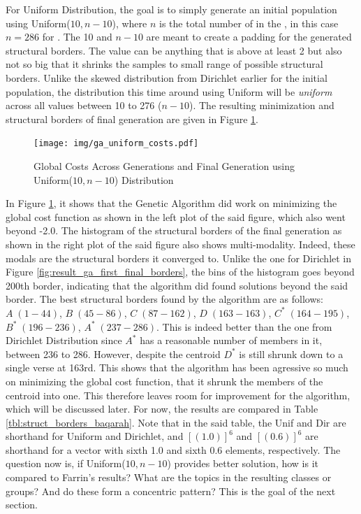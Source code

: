 For Uniform Distribution, the goal is to simply generate an initial population using Uniform($10,n-10$), where $n$ is the total number of   in the  , in this case $n=286$ for  . The 10 and $n-10$ are meant to create a padding for the generated structural borders. The value can be anything that is above at least 2 but also not so big that it shrinks the samples to small range of possible structural borders. Unlike the skewed distribution from Dirichlet earlier for the initial population, the distribution this time around using Uniform will be \textit{uniform} across all values between 10 to 276 ($n-10$). The resulting minimization and structural borders of final generation are given in Figure \ref{fig:result_ga_uniform}. 

\begin{figure}[!t]
    \centering
    \texttt{[image: img/ga\_uniform\_costs.pdf]}
    \caption{Global Costs Across Generations and Final Generation using Uniform($10,n-10$) Distribution}
    \label{fig:result_ga_uniform}
\end{figure}

In Figure \ref{fig:result_ga_uniform}, it shows that the Genetic Algorithm did work on minimizing the global cost function as shown in the left plot of the said figure, which also went beyond -2.0. The histogram of the structural borders of the final generation as shown in the right plot of the said figure also shows multi-modality. Indeed, these modals are the structural borders it converged to. Unlike the one for Dirichlet in Figure \ref{fig:result_ga_first_final_borders}, the bins of the histogram goes beyond 200th border, indicating that the algorithm did found solutions beyond the said border. The best structural borders found by the algorithm are as follows: $A\;(1-44)$, $B\;(45-86)$, $C\;(87-162)$, $D\;(163-163)$, $C^*\;(164-195)$, $B^*\;(196-236)$, $A^*\;(237-286)$. This is indeed better than the one from Dirichlet Distribution since $A^*$ has a reasonable number of members in it, between   236 to 286. However, despite the centroid $D^*$ is still shrunk down to a single verse at 163rd. This shows that the algorithm has been agressive so much on minimizing the global cost function, that it shrunk the members of the centroid into one. This therefore leaves room for improvement for the algorithm, which will be discussed later. For now, the results are compared in Table \ref{tbl:struct_borders_baqarah}. Note that in the said table, the Unif and Dir are shorthand for Uniform and Dirichlet, and $[(1.0)]^6$ and $[(0.6)]^6$ are shorthand for a vector with sixth 1.0 and sixth 0.6 elements, respectively. The question now is, if Uniform($10,n-10$) provides better solution, how is it compared to Farrin's results? What are the topics in the resulting classes or groups? And do these form a concentric pattern? This is the goal of the next section.

